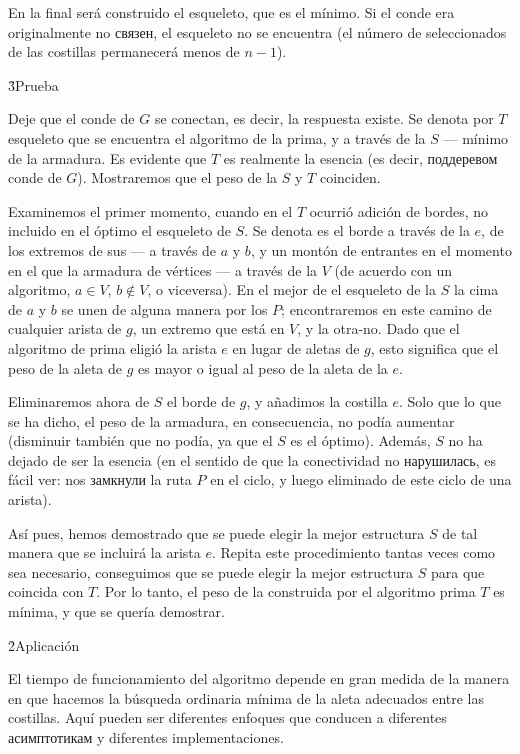 En la final será construido el esqueleto, que es el mínimo. Si el conde era originalmente no связен, el esqueleto no se encuentra (el número de seleccionados de las costillas permanecerá menos de $n-1$).


\h3{Prueba}

Deje que el conde de $G$ se conectan, es decir, la respuesta existe. Se denota por $T$ esqueleto que se encuentra el algoritmo de la prima, y a través de la $S$ --- mínimo de la armadura. Es evidente que $T$ es realmente la esencia (es decir, поддеревом conde de $G$). Mostraremos que el peso de la $S$ y $T$ coinciden.

Examinemos el primer momento, cuando en el $T$ ocurrió adición de bordes, no incluido en el óptimo el esqueleto de $S$. Se denota es el borde a través de la $e$, de los extremos de sus --- a través de $a$ y $b$, y un montón de entrantes en el momento en el que la armadura de vértices --- a través de la $V$ (de acuerdo con un algoritmo, $a \in V$, $b \not\in V$, o viceversa). En el mejor de el esqueleto de la $S$ la cima de $a$ y $b$ se unen de alguna manera por los $P$; encontraremos en este camino de cualquier arista de $g$, un extremo que está en $V$, y la otra-no. Dado que el algoritmo de prima eligió la arista $e$ en lugar de aletas de $g$, esto significa que el peso de la aleta de $g$ es mayor o igual al peso de la aleta de la $e$.

Eliminaremos ahora de $S$ el borde de $g$, y añadimos la costilla $e$. Solo que lo que se ha dicho, el peso de la armadura, en consecuencia, no podía aumentar (disminuir también que no podía, ya que el $S$ es el óptimo). Además, $S$ no ha dejado de ser la esencia (en el sentido de que la conectividad no нарушилась, es fácil ver: nos замкнули la ruta $P$ en el ciclo, y luego eliminado de este ciclo de una arista).

Así pues, hemos demostrado que se puede elegir la mejor estructura $S$ de tal manera que se incluirá la arista $e$. Repita este procedimiento tantas veces como sea necesario, conseguimos que se puede elegir la mejor estructura $S$ para que coincida con $T$. Por lo tanto, el peso de la construida por el algoritmo prima $T$ es mínima, y que se quería demostrar.


\h2{Aplicación}

El tiempo de funcionamiento del algoritmo depende en gran medida de la manera en que hacemos la búsqueda ordinaria mínima de la aleta adecuados entre las costillas. Aquí pueden ser diferentes enfoques que conducen a diferentes асимптотикам y diferentes implementaciones.


